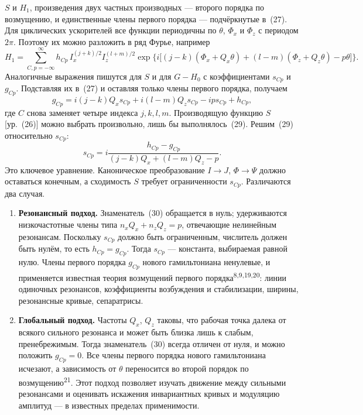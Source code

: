 \documentclass[11pt,a4paper]{article}
\begin{document}
$S$ и $H_1$, произведения двух частных производных --- второго порядка по
возмущению, и единственные члены первого порядка --- подчёркнутые в~(27). Для
циклических ускорителей все функции периодичны по $\theta$, $\Phi_x$ и $\Phi_z$
с периодом $2\pi$. Поэтому их можно разложить в ряд Фурье, например
\begin{equation}
H_1=\sum_{C,p=-\infty}^{\infty}
h_{Cp}\,I_x^{(j+k)/2}I_z^{(l+m)/2}
\exp\bigl\{i\bigl[(j-k)(\Phi_x+Q_x\theta)+(l-m)(\Phi_z+Q_z\theta)-p\theta\bigr]\bigr\}.
\end{equation}
Аналогичные выражения пишутся для $S$ и для $G-H_0$ с коэффициентами $s_{Cp}$ и
$g_{Cp}$. Подставляя их в~(27) и оставляя только члены первого порядка,
получаем
\begin{equation}
g_{Cp}=i(j-k)Q_x s_{Cp}+i(l-m)Q_z s_{Cp}-i p s_{Cp}+h_{Cp},
\end{equation}
где $C$ снова заменяет четыре индекса $j,k,l,m$. Производящую функцию $S$
[ур.~(26)] можно выбрать произвольно, лишь бы выполнялось~(29). Решим~(29)
относительно $s_{Cp}$:
\begin{equation}
s_{Cp}=i\frac{h_{Cp}-g_{Cp}}{(j-k)Q_x+(l-m)Q_z-p}.
\end{equation}
Это ключевое уравнение. Каноническое преобразование $I\to J$, $\Phi\to\Psi$
должно оставаться конечным, а сходимость $S$ требует ограниченности $s_{Cp}$.
Различаются два случая.

\begin{enumerate}
\item[(i)] \textbf{Резонансный подход.} Знаменатель~(30) обращается в нуль;
удерживаются низкочастотные члены типа $n_x Q_x+n_z Q_z=p$, отвечающие
нелинейным резонансам. Поскольку $s_{Cp}$ должно быть ограниченным, числитель
должен быть нулём, то есть $h_{Cp}=g_{Cp}$. Тогда $s_{Cp}$ --- константа,
выбираемая равной нулю. Члены первого порядка $g_{Cp}$ нового гамильтониана
ненулевые, и применяется известная теория возмущений первого
порядка\textsuperscript{8,9,19,20}: линии одиночных резонансов, коэффициенты
возбуждения и стабилизации, ширины, резонансные кривые, сепаратрисы.

\item[(ii)] \textbf{Глобальный подход.} Частоты $Q_x$, $Q_z$ таковы, что рабочая
точка далека от всякого сильного резонанса и может быть близка лишь к слабым,
пренебрежимым. Тогда знаменатель~(30) всегда отличен от нуля, и можно положить
$g_{Cp}=0$. Все члены первого порядка нового гамильтониана исчезают, а
зависимость от $\theta$ переносится во второй порядок по
возмущению\textsuperscript{21}. Этот подход позволяет изучать движение между
сильными резонансами и оценивать искажения инвариантных кривых и модуляцию
амплитуд --- в известных пределах применимости.
\end{enumerate}
\end{document}
